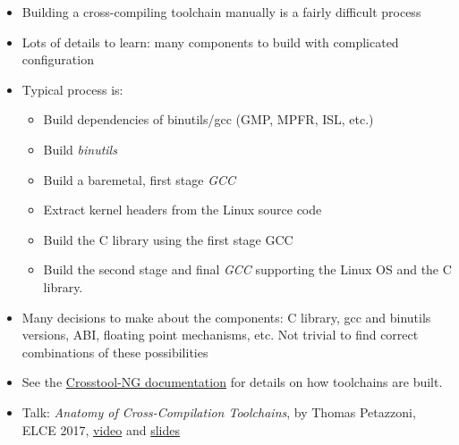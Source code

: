   \begin{itemize}
  \item Building a cross-compiling toolchain manually is a fairly
    difficult process
  \item Lots of details to learn: many components to build with
    complicated configuration
  \item Typical process is:
    \begin{itemize}
    \item Build dependencies of binutils/gcc (GMP, MPFR, ISL, etc.)
    \item Build {\em binutils}
    \item Build a baremetal, first stage {\em GCC}
    \item Extract kernel headers from the Linux source code
    \item Build the C library using the first stage GCC
    \item Build the second stage and final {\em GCC} supporting the Linux
          OS and the C library.
    \end{itemize}
  \item Many decisions to make about the components: C library, gcc
    and binutils versions, ABI, floating point mechanisms, etc. Not
    trivial to find correct combinations of these possibilities
  \item See the
    \href{https://crosstool-ng.github.io/docs/toolchain-construction/}{Crosstool-NG
      documentation} for details on how toolchains are built.
  \item Talk: {\em Anatomy of Cross-Compilation Toolchains}, by Thomas
    Petazzoni, ELCE 2017, \href{https://youtu.be/Pbt330zuNPc}{video} and
    \href{https://elinux.org/images/1/15/Anatomy_of_Cross-Compilation_Toolchains.pdf}{slides}
\end{itemize}


